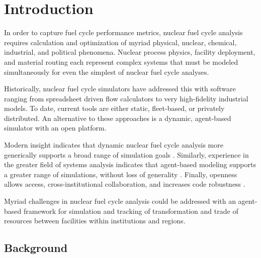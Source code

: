 
\section{Introduction}


In order to capture fuel cycle performance metrics, nuclear fuel cycle analysis 
requires calculation and optimization of myriad physical, nuclear, chemical, industrial, 
and political phenomena. Nuclear process physics, facility 
deployment, and material routing each represent complex systems that must be 
modeled simultaneously for even the simplest of nuclear fuel cycle analyses.

Historically, nuclear fuel cycle simulators have addressed this with software 
ranging from spreadsheet driven flow calculators to very high-fidelity 
industrial models.  To date, current tools are either static, fleet-based, or 
privately distributed.  An alternative to these approaches is a dynamic, 
agent-based simulator with an open platform. 

Modern insight indicates that dynamic nuclear 
fuel cycle analysis more generically supports a broad range of simulation goals 
\cite{piet_dynamic_2011}. Similarly, experience in the greater field of systems 
analysis indicates that agent-based modeling supports a greater range of 
simulations, without loss of generality \cite{thatpapermattsent}. Finally, 
openness allows access, cross-institutional collaboration, and increases code 
robustness \cite{softwarecarpentryresource}.

Myriad challenges in nuclear fuel cycle analysis could be 
addressed with an agent-based framework for simulation and tracking of 
transformation and trade of resources between facilities within institutions 
and regions.  

\subsection{Background}


